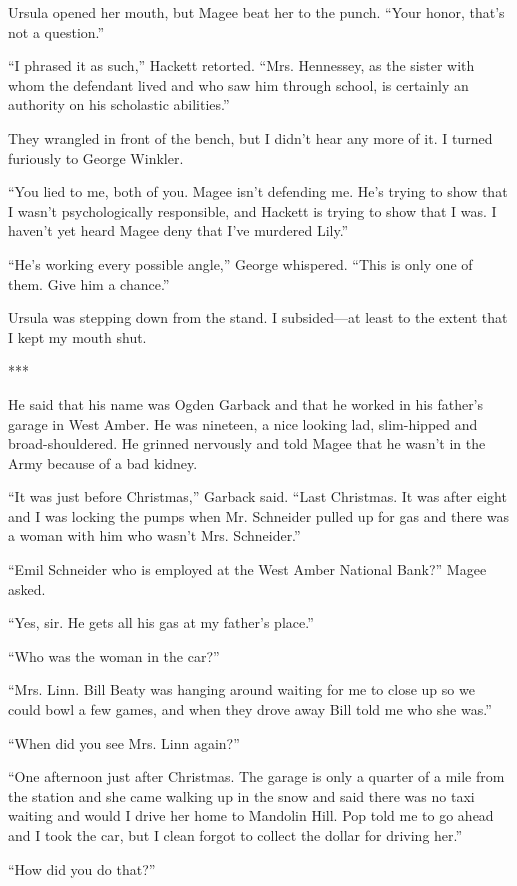 \documentclass{novel}
\begin{document}
{Ursula opened her mouth, but Magee beat her to the punch. “Your honor, that’s not a question.”

“I phrased it as such,” Hackett retorted. “Mrs. Hennessey, as the sister with whom the defendant lived and who saw him through school, is certainly an authority on his scholastic abilities.”

They wrangled in front of the bench, but I didn’t hear any more of it. I turned furiously to George Winkler.

“You lied to me, both of you. Magee isn’t defending me. He’s trying to show that I wasn’t psychologically responsible, and Hackett is trying to show that I was. I haven’t yet heard Magee deny that I’ve murdered Lily.”

“He’s working every possible angle,” George whispered. “This is only one of them. Give him a chance.”

Ursula was stepping down from the stand. I subsided—at least to the extent that I kept my mouth shut.

***

He said that his name was Ogden Garback and that he worked in his father’s garage in West Amber. He was nineteen, a nice looking lad, slim-hipped and broad-shouldered. He grinned nervously and told Magee that he wasn’t in the Army because of a bad kidney.

“It was just before Christmas,” Garback said. “Last Christmas. It was after eight and I was locking the pumps when Mr. Schneider pulled up for gas and there was a woman with him who wasn’t Mrs. Schneider.”

“Emil Schneider who is employed at the West Amber National Bank?” Magee asked.

“Yes, sir. He gets all his gas at my father’s place.”

“Who was the woman in the car?”

“Mrs. Linn. Bill Beaty was hanging around waiting for me to close up so we could bowl a few games, and when they drove away Bill told me who she was.”

“When did you see Mrs. Linn again?”

“One afternoon just after Christmas. The garage is only a quarter of a mile from the station and she came walking up in the snow and said there was no taxi waiting and would I drive her home to Mandolin Hill. Pop told me to go ahead and I took the car, but I clean forgot to collect the dollar for driving her.”

“How did you do that?”

}
\end{document}
